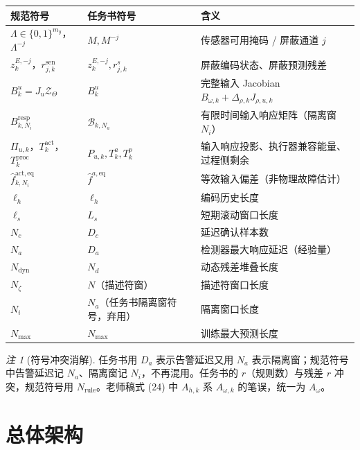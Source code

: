 \documentclass[11pt,a4paper]{ctexart}
\theoremstyle{remark}
\newtheorem{remark}{注}
\newcommand{\ZT}{\mathcal{Z}_{\Theta}}
\begin{document}
\begin{longtable}{L{0.24\textwidth}L{0.16\textwidth}L{0.48\textwidth}}
\toprule
规范符号 & 任务书符号 & 含义 \\
\midrule
\endhead
$\Lambda\in\{0,1\}^{m_y}$，$\Lambda^{-j}$ & $M,M^{-j}$ & 传感器可用掩码 / 屏蔽通道 $j$ \\
$z^{E,-j}_k$，$r^{\mathrm{sen}}_{j,k}$ & $z_k^{E,-j},r_{j,k}^s$ & 屏蔽编码状态、屏蔽预测残差 \\
$B^u_k=J_u\ZT$ & $B_k^u$ & 完整输入 Jacobian $B_{\omega,k}+\Delta_{\rho,k}J_{\rho,u,k}$ \\
$B^{\mathrm{resp}}_{k,N_i}$ & $\mathcal B_{k,N_a}$ & 有限时间输入响应矩阵（隔离窗 $N_i$） \\
$\Pi_{u,k}$，$T^{\mathrm{act}}_k$，$T^{\mathrm{proc}}_k$ & $P_{u,k},T_k^a,T_k^p$ & 输入响应投影、执行器兼容能量、过程侧剩余 \\
$\hat f^{\mathrm{act,eq}}_{k,N_i}$ & $\hat f^{a,\mathrm{eq}}$ & 等效输入偏差（非物理故障估计） \\
$\ell_h$ & $\ell_h$ & 编码历史长度 \\
$\ell_s$ & $L_s$ & 短期滚动窗口长度 \\
$N_c$ & $D_c$ & 延迟确认样本数 \\
$N_a$ & $D_a$ & 检测器最大响应延迟（经验量） \\
$N_{\mathrm{dyn}}$ & $N_d$ & 动态残差堆叠长度 \\
$N_\zeta$ & $N$（描述符窗） & 描述符窗口长度 \\
$N_i$ & $N_a$（任务书隔离窗符号，弃用） & 隔离窗口长度 \\
$N_{\max}$ & $N_{\max}$ & 训练最大预测长度 \\
\bottomrule
\end{longtable}

\begin{remark}[符号冲突消解]
任务书用 $D_a$ 表示告警延迟又用 $N_a$ 表示隔离窗；规范符号中告警延迟记 $N_a$、隔离窗记 $N_i$，不再混用。任务书的 $r$（规则数）与残差 $r$ 冲突，规范符号用 $N_{\mathrm{rule}}$。老师稿式 (24) 中 $A_{h,k}$ 系 $A_{\omega,k}$ 的笔误，统一为 $A_\omega$。
\end{remark}

\section{总体架构}
\end{document}
